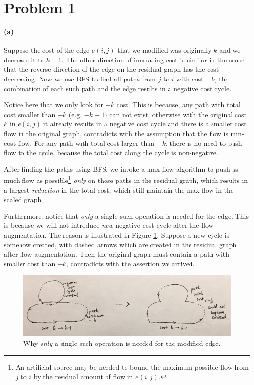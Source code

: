 \documentclass[12pt]{article}
\begin{document}
	
\section*{Problem 1}
\paragraph{(a)} Suppose the cost of the edge $e(i,j)$ that we modified was originally $k$ and we decrease it to $k-1$. The other direction of increasing cost is similar in the sense that the reverse direction of the edge on the residual graph has the cost decreasing. Now we use BFS to find all paths from $j$ to $i$ with cost $-k$, the combination of each such path and the edge results in a negative cost cycle. 

Notice here that we only look for $-k$ cost. This is because, any path with total cost smaller than $-k$ (e.g. $-k-1$) can not exist, otherwise with the original cost $k$ in $e(i, j)$ it already results in a negative cost cycle and there is a smaller cost flow in the original graph, contradicts with the assumption that the flow is min-cost flow. For any path with total cost larger than $-k$, there is no need to push flow to the cycle, because the total cost along the cycle is non-negative.

After finding the paths using BFS, we invoke a max-flow algorithm to push as much flow as possible\footnote{An artificial source may be needed to bound the maximum possible flow from $j$ to $i$ by the residual amount of flow in $e(i, j)$.} \emph{only} on those paths in the residual graph, which results in a largest \emph{reduction} in the total cost, which still maintain the max flow in the scaled graph.  

Furthermore, notice that \emph{only} a single such operation is needed for the edge. This is because we will not introduce \emph{new} negative cost cycle after the flow augmentation. The reason is illustrated in Figure \ref{fig:1-1}. Suppose a new cycle is somehow created, with dashed arrows which are created in the residual graph after flow augmentation. Then the original graph must contain a path with smaller cost than $-k$, contradicts with the assertion we arrived. 
\begin{figure}[h!]
	\centering
	\includegraphics[width=1\textwidth]{1-1.jpg}
	\caption{Why \emph{only} a single such operation is needed for the modified edge.}
	\label{fig:1-1}
\end{figure}
\end{document}
